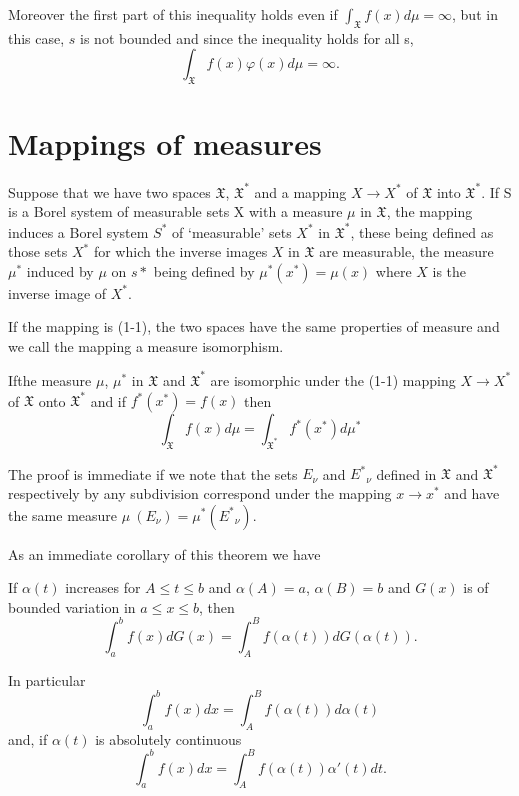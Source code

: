 Moreover the first part of this inequality holds even if
$\int_{\mathfrak{X}} f(x) d \mu =\infty$, but in this case, $s$ is not
bounded and since the inequality holds for all s,
$$ 
\int_{\mathfrak{X}} f(x) \varphi (x) d \mu = \infty. 
$$

\section{Mappings of measures}\label{chap1:sec17}

Suppose that we have two spaces $\mathfrak{X}$, $\mathfrak{X}^*$ and a
mapping $X \rightarrow X^*$ of $\mathfrak{X}$ into $
\mathfrak{X}^*$. If S is a Borel system of measurable sets X with a
measure $\mu$ in $\mathfrak{X}$, the mapping induces a 
Borel system $ S^* $ of `measurable' sets $X^*$ in $\mathfrak{X}^*$,
these being defined as those sets $X^*$ for which the inverse images $X$
in $ \mathfrak{X} $ are measurable, the measure $\mu^*$ induced by
$\mu$ 
on $ s* $ being defined by $\mu^*(x^*) = \mu (x) $ where $X$ is the
inverse image of $X^*$. 

If the mapping is (1-1), the two spaces have the same properties of
measure and we call the mapping a measure isomorphism. 

\begin{theorem}\label{chap1:sec17:thm46}
  If\pageoriginale the measure $\mu$, $\mu^*$ in $\mathfrak{X}$ and
  $\mathfrak{X}^*$ 
  are isomorphic under the (1-1) mapping $ X \rightarrow X^*$ of  
  $\mathfrak{X}$  onto $\mathfrak{X}^*$ and if $f^*(x^*)=f(x)$ then 
  $$ 
  \int_{\mathfrak{X}} f(x) d \mu =
  \int_{\mathfrak{X}^*} f^* (x^*) d \mu^*
  $$
\end{theorem}

The proof is immediate if we note that the sets $E_\nu$ and $ E^*{_\nu}$
defined in $\mathfrak{X}$ and $\mathfrak{X}^*$ respectively by any
subdivision correspond under the mapping $ x \rightarrow x^* $ 
and have the same measure $ \mu~ (E_\nu) = \mu^*(E^*{_\nu})$. 

As an immediate corollary of this theorem we have 
\begin{theorem}\label{chap1:sec17:thm47}
  If $ \alpha (t)$ increases for $A  \leq t \leq b$ and $\alpha (A) = a$,
  $\alpha(B) = b $ and $G(x)$ is of  
  bounded variation in $a \leq x \leq b$, then
  $$
  \int^b_{a} f(x) dG(x) = \int^B_{A} f(\alpha(t)) dG (\alpha(t)).
  $$  
  
  In particular 
  $$ 
  \int^b_{a}  f(x) dx= \int^B_{A} f(\alpha(t)) d \alpha(t)
  $$
  and, if $\alpha(t)$ is absolutely continuous 
  $$ 
  \int^b_{a} f(x) dx = \int^B_{A} f(\alpha(t)) \alpha' (t) dt. 
  $$
\end{theorem}


